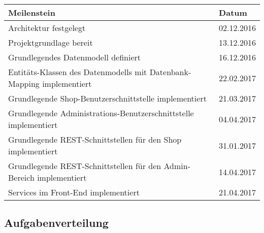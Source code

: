 \begin{tabular}{|p{}|p{}|}
	\hline 
	\textbf{Meilenstein} & \textbf{Datum} \\ 
	\hline 
	Architektur festgelegt & 02.12.2016 \\ 
	\hline 
	Projektgrundlage bereit & 13.12.2016 \\ 
	\hline 
	Grundlegendes Datenmodell definiert & 16.12.2016 \\ 
	\hline 
	Entitäts-Klassen des Datenmodells mit Datenbank-Mapping implementiert & 22.02.2017 \\ 
	\hline 
	Grundlegende Shop-Benutzerschnittstelle implementiert & 21.03.2017 \\ 
	\hline 
	Grundlegende Administrations-Benutzerschnittstelle implementiert & 04.04.2017 \\ 
	\hline 
	Grundlegende REST-Schnittstellen für den Shop implementiert & 31.01.2017 \\ 
	\hline 
	Grundlegende REST-Schnittstellen für den Admin-Bereich implementiert & 14.04.2017 \\ 
	\hline 
	Services im Front-End implementiert	& 21.04.2017 \\ 
	\hline 
	
\end{tabular} 
\label{tab:milestones} 

\subsection{Aufgabenverteilung}


